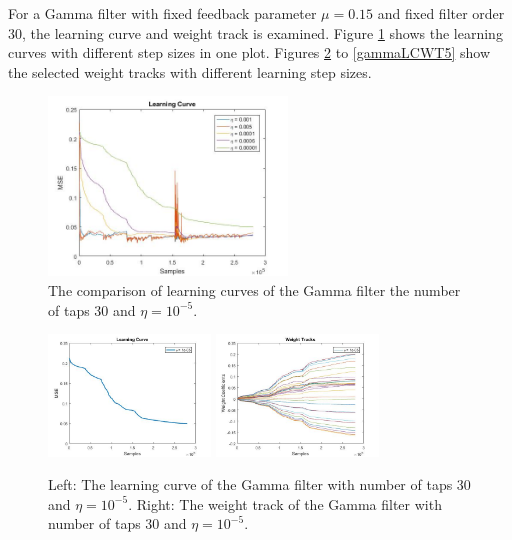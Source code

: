 \documentclass[conference]{IEEEtran}
\begin{document}
	For a Gamma filter with fixed feedback parameter $\mu = 0.15$ and fixed filter order 30, the learning curve and weight track is examined. Figure \ref{LCGammaAll} shows the learning curves with different step sizes in one plot.
Figures \ref{gammaLCWT1} to \ref{gammaLCWT5} show the selected weight tracks with different learning step sizes. 


	\begin{figure}[htbp]
	\centerline{\includegraphics[width=2.5in]{Gamma_LC_all_mu15_M30.jpg}}
	\caption{The comparison of learning curves of the Gamma filter the number of taps 30 and  $\eta =10^{-5}$.}
	\label{LCGammaAll}
	\end{figure}	

	\begin{figure}[htbp]
	\centering
	\includegraphics[width = 1.7in]{Gamma_LC_eta5_mu15_M30.jpg}
	\includegraphics[width=1.7in]{Gamma_WT_eta1_mu15_M30.jpg}
	\caption{Left: The learning curve of the Gamma filter with number of taps 30 and  $\eta =10^{-5}$. Right: The weight track of the Gamma filter with number of taps 30 and  $\eta = 10^{-5}$.}
	\label{gammaLCWT1}
	\end{figure}
\end{document}
